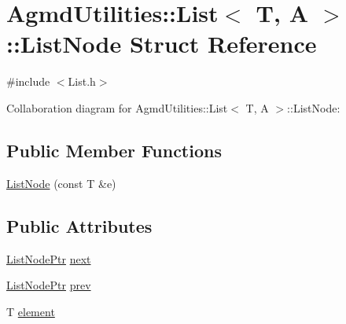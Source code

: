 \hypertarget{struct_agmd_utilities_1_1_list_1_1_list_node}{\section{Agmd\+Utilities\+:\+:List$<$ T, A $>$\+:\+:List\+Node Struct Reference}
\label{struct_agmd_utilities_1_1_list_1_1_list_node}
}


{\ttfamily \#include $<$List.\+h$>$}



Collaboration diagram for Agmd\+Utilities\+:\+:List$<$ T, A $>$\+:\+:List\+Node\+:
\subsection*{Public Member Functions}
\begin{DoxyCompactItemize}
\item 
\hyperlink{struct_agmd_utilities_1_1_list_1_1_list_node_af0f4f45bdfdd3a0c0caa812a834284fb}{List\+Node} (const T \&e)
\end{DoxyCompactItemize}
\subsection*{Public Attributes}
\begin{DoxyCompactItemize}
\item 
\hyperlink{class_agmd_utilities_1_1_list_a41bf36081cbb28f08e4e4a9f6f45f4f6}{List\+Node\+Ptr} \hyperlink{struct_agmd_utilities_1_1_list_1_1_list_node_ac267accf962da56f1c76b7e2f88cca33}{next}
\item 
\hyperlink{class_agmd_utilities_1_1_list_a41bf36081cbb28f08e4e4a9f6f45f4f6}{List\+Node\+Ptr} \hyperlink{struct_agmd_utilities_1_1_list_1_1_list_node_aeca4057e42c540101b808c2c745a21f7}{prev}
\item 
T \hyperlink{struct_agmd_utilities_1_1_list_1_1_list_node_aec5ea78bee50e2a776753148e709353d}{element}
\end{DoxyCompactItemize}


